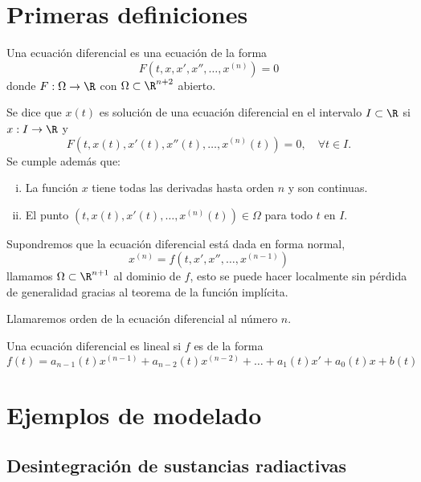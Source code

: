 \documentclass[../ecuaciones_diferenciales.tex]{subfiles}
\begin{document}
\section{Primeras definiciones}

\begin{definition}
	Una ecuación diferencial es una ecuación de la forma
	\[F(t, x, x', x'', \dots, x^{(n)}) = 0\]
	donde \(F : \Omega \to \R\) con \(\Omega \subset \R^{n + 2}\) abierto.
\end{definition}

\begin{definition}
	Se dice que \(x(t)\) es solución de una ecuación diferencial en el intervalo
	\(I \subset \R\) si \(x : I \to \R\) y
	\[F(t, x(t), x'(t), x''(t), \dots, x^{(n)}(t)) = 0, \quad \forall t \in I.\]
	Se cumple además que:
	\begin{enumerate}[i)]
		\item La función \(x\) tiene todas las derivadas hasta orden \(n\) y son
		      continuas.

		\item El punto \((t, x(t), x'(t), \dots, x^{(n)}(t)) \in \Omega\) para
		      todo \(t\) en \(I\).
	\end{enumerate}
\end{definition}

Supondremos que la ecuación diferencial está dada en forma normal,
\[x^{(n)} = f(t, x', x'', \dots, x^{(n - 1)})\]
llamamos \(\Omega \subset \R^{n + 1}\) al dominio de \(f\), esto se puede hacer
localmente sin pérdida de generalidad gracias al teorema de la función
implícita.

\begin{remark}
	Llamaremos orden de la ecuación diferencial al número \(n\).
\end{remark}

\begin{definition}
	Una ecuación diferencial es lineal si \(f\) es de la forma
	\[f(t) = a_{n - 1}(t)x^{(n - 1)} + a_{n - 2}(t)x^{(n - 2)} +
		\dots + a_1(t)x' + a_0(t)x + b(t)\]
\end{definition}

\section{Ejemplos de modelado}

\subsection{Desintegración de sustancias radiactivas}
\end{document}
